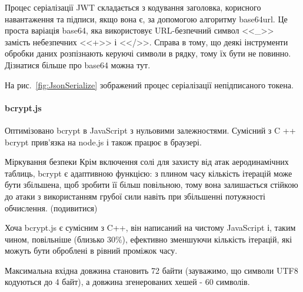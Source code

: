 Процес серіалізації JWT складається з кодування заголовка, корисного навантаження та підписи, якщо вона є, за допомогою алгоритму base64url. Це проста варіація base64, яка використовує URL-безпечний символ <<\_>> замість небезпечних <<+>> і <</>>. Справа в тому, що деякі інструменти обробки даних розпізнають керуючі символи в рядку, тому їх бути не повинно. Дізнатися більше про base64 можна тут.

На рис.~\ref{fig:JsonSerialize} зображений процес серіалізації непідписаного токена.


\paragraph{bcrypt.js}

Оптимізовано bcrypt в JavaScript з нульовими залежностями. Сумісний з C ++ bcrypt прив'язка на node.js і також працює в браузері.

Міркування безпеки
Крім включення солі для захисту від атак аеродинамічних таблиць, bcrypt є адаптивною функцією: з плином часу кількість ітерацій може бути збільшена, щоб зробити її більш повільною, тому вона залишається стійкою до атаки з використанням грубої сили навіть при збільшенні потужності обчислення. (подивитися)

Хоча bcrypt.js є сумісним з C++, він написаний на чистому JavaScript і, таким чином, повільніше (близько 30\%), ефективно зменшуючи кількість ітерацій, які можуть бути оброблені в рівний проміжок часу.

Максимальна вхідна довжина становить 72 байти (зауважимо, що символи UTF8 кодуються до 4 байт), а довжина згенерованих хешей - 60 символів.
